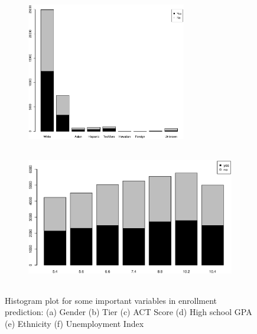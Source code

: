 \documentclass[12pt,english]{report}
\begin{document}
\begin{figure}[p]
\medskip
\begin{subfigure}{0.45\textwidth}
\includegraphics[width=\linewidth, height=6cm]{pic/enroll_ethnicity}
\caption{} \label{enroll:e}
\end{subfigure}\hspace*{\fill}
\begin{subfigure}{0.45\textwidth}
\includegraphics[width=\linewidth, height=6cm]{pic/enroll_index}
\caption{} \label{enroll:f}
\end{subfigure}
  \caption{Histogram plot for some important variables in enrollment
prediction: 
                        (a) Gender (b) Tier (c) ACT Score (d) High school GPA
(e) Ethnicity (f) Unemployment Index}
  \label{enroll_sum} 
\end{figure}
\end{document}
